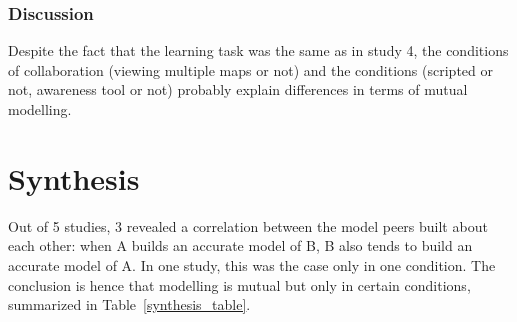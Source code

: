 \documentclass[twocolumn]{article}
\begin{document}
\subsubsection*{Discussion}

Despite the fact that the learning task was the same as in study 4, the
conditions of collaboration (viewing multiple maps or not) and the conditions
(scripted or not, awareness tool or not) probably explain differences in terms
of mutual modelling.

\section{Synthesis}

Out of 5 studies, 3 revealed a correlation between the model peers built about
each other: when A builds an accurate model of B, B also tends to build an
accurate model of A.  In one study, this was the case only in one condition.
The conclusion is hence that modelling is mutual but only in certain conditions,
summarized in Table~\ref{synthesis_table}.
\end{document}
